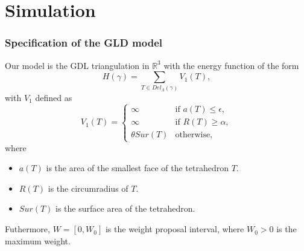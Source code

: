 \documentclass[c, 10pt]{beamer}
\begin{document}
\section{Simulation}
\framesection{}




\begin{frame}\frametitle{Specification of the GLD model}
Our model is the GDL triangulation in $\mathbb R^3$ with  the energy function of the form
$$H(\gamma)= \sum_{T \in Del_\Lambda(\gamma)} V_1(T),$$ 
with $V_1$ defined as
\begin{equation}\label{model}
V_1(T) = 
\left\{
    \begin{array}{ll}
        \infty & \mbox{if } a(T)\leq \epsilon, \\
        \infty & \mbox{if } R(T)\geq \alpha, \\
        \theta Sur(T) & \mbox{otherwise, }
    \end{array}
\right. 
\end{equation}
where
\begin{itemize}
\item $a(T)$ is the area of the smallest face of the tetrahedron $T$.
\item $R(T)$ is the circumradius of $T$.
\item $Sur(T)$ is the surface area of the tetrahedron.
\end{itemize}

Futhermore, $W = [0,W_0]$ is the weight proposal interval, where $W_0>0$ is the maximum weight.

\end{frame}
\end{document}
